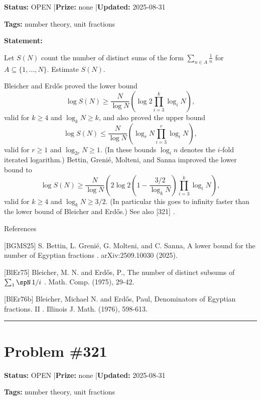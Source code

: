 \documentclass{article}
\begin{document}
\noindent\textbf{Status:} OPEN \quad|\quad \textbf{Prize:} none \quad|\quad \textbf{Updated:} 2025-08-31

\noindent\textbf{Tags:} number theory, unit fractions

\medskip

\noindent\textbf{Statement:}

Let $S(N)$ count the number of distinct sums of the form $\sum_{n\in A}\frac{1}{n}$ for $A\subseteq \{1,\ldots,N\}$. Estimate $S(N)$.




Bleicher and Erd\H{o}s \cite{BlEr75} proved the lower bound\[\log S(N)\geq \frac{N}{\log N}\left(\log 2\prod_{i=3}^k\log_iN\right),\]valid for $k\geq 4$ and $\log_kN\geq k$, and also \cite{BlEr76b} proved the upper bound\[\log S(N)\leq \frac{N}{\log N}\left(\log_r N \prod_{i=3}^r \log_iN\right),\]valid for $r\geq 1$ and $\log_{2r}N\geq 1$. (In these bounds $\log_in$ denotes the $i$-fold iterated logarithm.) Bettin, Greni\'{e}, Molteni, and Sanna \cite{BGMS25} improved the lower bound to\[\log S(N) \geq \frac{N}{\log N}\left(2\log 2\left(1-\frac{3/2}{\log_kN}\right)\prod_{i=3}^k\log_iN\right),\]valid for $k\geq 4$ and $\log_kN\geq 3/2$. (In particular this goes to infinity faster than the lower bound of Bleicher and Erd\H{o}s.) See also [321] .




References

[BGMS25] S. Bettin, L. Greni\'{e}, G. Molteni, and C. Sanna, A lower bound for the number of Egyptian fractions . arXiv:2509.10030 (2025).

[BlEr75] Bleicher, M. N. and Erd\H{o}s, P., The number of distinct subsums of $\sum \sb{1}\spN\,1/i$ . Math. Comp. (1975), 29-42.

[BlEr76b] Bleicher, Michael N. and Erd\H{o}s, Paul, Denominators of Egyptian fractions. II . Illinois J. Math. (1976), 598-613.

\noindent\rule{\linewidth}{0.4pt}


\section{Problem \#321}
\label{prob:321}

\noindent\textbf{Status:} OPEN \quad|\quad \textbf{Prize:} none \quad|\quad \textbf{Updated:} 2025-08-31

\noindent\textbf{Tags:} number theory, unit fractions
\end{document}
